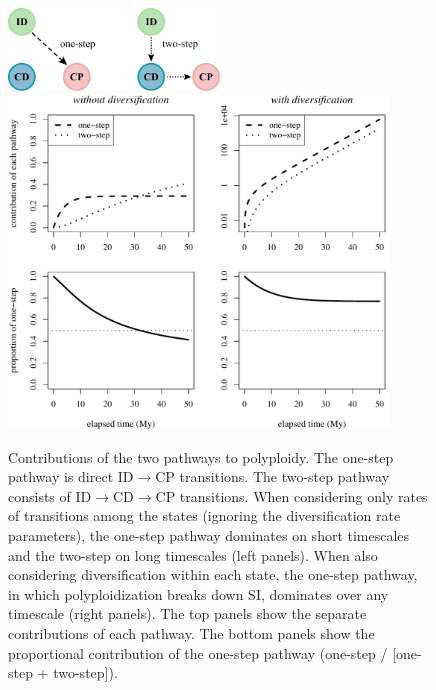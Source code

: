 \begin{figure}
    \centering 
    \includegraphics[width=0.5\textwidth]{pathstates2} \\ [40pt] 
        \includegraphics[width=0.9\textwidth]{pathways}
    \caption{
        Contributions of the two pathways to polyploidy.
        The one-step pathway is direct ID$\rightarrow$CP transitions.
        The two-step pathway consists of ID$\rightarrow$CD$\rightarrow$CP transitions.
        When considering only rates of transitions among the states (ignoring the diversification rate parameters), the one-step pathway dominates on short timescales and the two-step on long timescales (left panels).
        When also considering diversification within each state, the one-step pathway, in which polyploidization breaks down SI, dominates over any timescale (right panels).
        The top panels show the separate contributions of each pathway.
        The bottom panels show the proportional contribution of the one-step pathway (\ie one-step / [one-step + two-step]).
    }
    \label{figure:pathways}
\end{figure}


